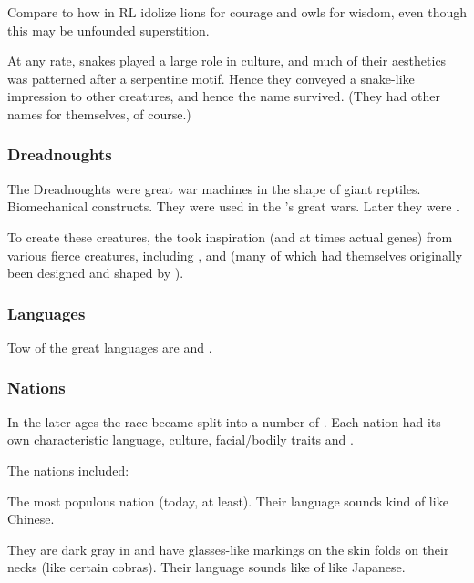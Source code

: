 Compare to how \humans{} in RL idolize lions for courage and owls for wisdom, even though this may be unfounded superstition. 

At any rate, snakes played a large role in \ophidian{} culture, and much of their aesthetics was patterned after a serpentine motif. 
Hence they conveyed a snake-like impression to other creatures, and hence the name \quo{\ophidian} survived. 
(They had other names for themselves, of course.)





\subsubsection{Dreadnoughts}
The Dreadnoughts were great war machines in the shape of giant reptiles.
Biomechanical constructs. 
They were used in the \caisiths's great wars.
Later they were . 

To create these creatures, the \ophidians{} took inspiration (and at times actual genes) from various fierce creatures, including \nycans, \corgoroth{} and \vreiiden{} (many of which had themselves originally been designed and shaped by \ophidians). 





\subsubsection{Languages}
Tow of the great \caisith languages are  and . 





\subsubsection{Nations}
In the later ages the \quiljaaran{} race became split into a number of . 
Each nation had its own characteristic language, culture, facial/bodily traits and \colours. 

The nations included:
\begin{gloss}

  \gitem{\KyanHweDin:} 
  The most populous nation (today, at least). 
  Their language sounds kind of like Chinese. 
  
  \gitem{\Okiriru:}
  They are dark gray in \colour and have glasses-like markings on the skin folds on their necks (like certain cobras). 
  Their language sounds like of like Japanese. 
\end{gloss}






